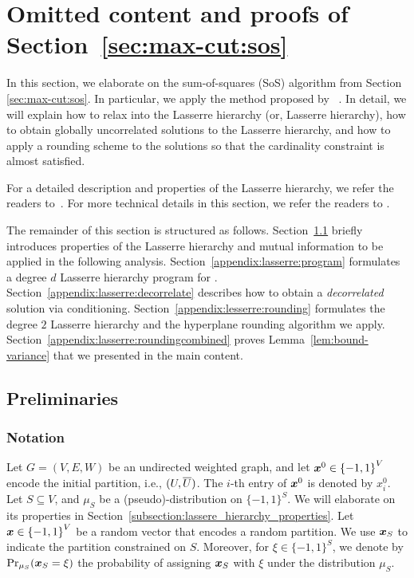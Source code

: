 

\section{Omitted content and proofs of Section~\ref{sec:max-cut:sos}}
\label{sec:sos_detailed}
In this section, we elaborate on the sum-of-squares (SoS) algorithm from Section \ref{sec:max-cut:sos}. 
In particular, we apply the method proposed by ~\cite{DBLP:conf/soda/RaghavendraT12}.
In detail, we will explain how to relax \maxcutkc into the Lasserre \sdp hierarchy (or, Lasserre hierarchy), how to obtain globally uncorrelated solutions to the Lasserre hierarchy, and how to apply a rounding scheme to the solutions so that the cardinality constraint is almost satisfied. 

For a detailed description and properties of the Lasserre \sdp hierarchy, we refer the readers to~\citep{DBLP:journals/siamjo/Lasserre02,rothvoss2013lasserre}.
For more technical details in this section, we refer the readers to  
\citep{DBLP:journals/talg/AustrinBG16,DBLP:conf/soda/RaghavendraT12,Chlamtac2012}.


The remainder of this section is structured as follows.
Section~\ref{subsection:lassere_hierarchy:preliminary} briefly introduces properties of the Lasserre hierarchy and mutual information to be applied in the following analysis. 
Section~\ref{appendix:lasserre:program} formulates a degree $d$ Lasserre hierarchy program for \maxcutkc.
Section~\ref{appendix:lasserre:decorrelate} describes how to obtain a \emph{decorrelated} solution via conditioning.
Section~\ref{appendix:lesserre:rounding}
formulates the degree $2$ Lasserre hierarchy and the hyperplane rounding algorithm we apply.
Section~\ref{appendix:lasserre:roundingcombined} proves
Lemma~\ref{lem:bound-variance} that we presented in the main content. 



\subsection{Preliminaries}
\label{subsection:lassere_hierarchy:preliminary}

\subsubsection{Notation}
\label{subsection:lassere_hierarchy:notations}
Let $G=(V,E,W)$ be an undirected weighted graph,
and let $\bm{x}^0 \in \left \{-1,1\right\}^{V}$ 
encode the initial partition, i.e., $(U, \overline{U})$. 
The $i$-th entry of $\bm{x}^0$ is denoted by $x^0_i$.
Let $S \subseteq V$, and $\mu_{S}$ be a (pseudo)-distribution on $\{-1, 1\}^S$. We will elaborate on its properties in Section~\ref{subsection:lassere_hierarchy_properties}.
Let $\bm{x} \in \left \{-1, 1\right\}^{V}$ be a random vector that encodes a random partition.
We use $\bm{x}_{S}$ to indicate the partition constrained on $S$.
Moreover, for $\xi \in \{-1, 1\}^S$, we denote by $\Pr_{\mu_{S}}(\bm{x}_{S} = \xi)$ the probability of assigning $\bm{x}_{S}$ with $\xi$ under the distribution $\mu_{S}$.

